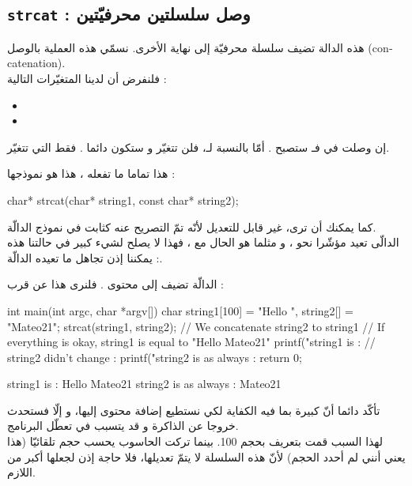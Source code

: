 \subsection{\texttt{strcat} : وصل سلسلتين محرفيّتين}
هذه الدالة تضيف سلسلة محرفيّة إلى نهاية الأخرى. نسمّي هذه العملية بالوصل
(\textenglish{concatenation}).\\
فلنفرض أن لدينا المتغيّرات التالية :
\begin{itemize}
  \item {}
  \item {}
\end{itemize}
إن وصلت
في
فـ
ستصبح
.
أمّا بالنسبة لـ،
فلن تتغيّر و ستكون دائما
.
فقط
التي تتغيّر.

هذا تماما ما تفعله
، هذا هو نموذجها :
\begin{Csource}
char* strcat(char* string1, const char* string2);
\end{Csource}
كما يمكنك أن ترى،
غير قابل للتعديل لأنّه تمّ التصريح عنه كثابت في نموذج الدالّة.\\
الدالّى تعيد مؤشّرا نحو
،
و مثلما هو الحال مع
،
فهذا لا يصلح لشيء كبير في حالتنا هذه : يمكننا إذن تجاهل ما تعيده الدالّة.

الدالّة تضيف إلى
محتوى
.
فلنرى هذا عن قرب :
\begin{Csource}
int main(int argc, char *argv[])
{
	char string1[100] = "Hello ", string2[] = "Mateo21";
	strcat(string1, string2); // We concatenate string2 to string1
	// If everything is okay, string1 is equal to "Hello Mateo21"
	 printf("string1 is : %
	// string2 didn’t change :
	printf("string2 is as always : %
	return 0;
}
\end{Csource}
\begin{Console}
string1 is : Hello Mateo21
string2 is as always : Mateo21
\end{Console}
تأكّد دائما أنّ
كبيرة بما فيه الكفاية لكي نستطيع إضافة محتوى
إليها، و إلّا فستحدث خروجا عن الذاكرة و قد يتسبب في تعطّل البرنامج.\\
لهذا السبب قمت بتعريف
بحجم 100. بينما تركت الحاسوب يحسب حجم
تلقائيّا (هذا يعني أنني لم أحدد الحجم) لأنّ هذه السلسلة لا يتمّ تعديلها، فلا حاجة إذن لجعلها أكبر من اللازم.

